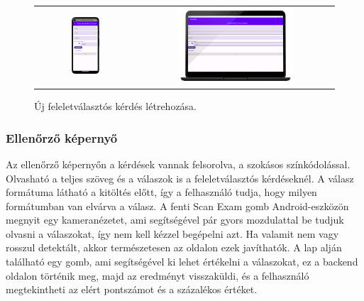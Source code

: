 \begin{figure}[!ht]
    \centering
    \begin{tabular}{cc}
        \includegraphics[width=0.3\textwidth, keepaspectratio]{figures/New_Android.png} & 
        \includegraphics[width=0.6\textwidth, keepaspectratio]{figures/New_Desktop_framed.png}
    \end{tabular}
    \caption{Új feleletválasztós kérdés létrehozása.}
    \label{fig:NewScreen}
\end{figure}


\subsubsection{Ellenőrző képernyő}

Az ellenőrző képernyőn a kérdések vannak felsorolva, a szokásos színkódolással.
Olvasható a teljes szöveg és a válaszok is a feleletválasztós kérdéseknél.
A válasz formátuma látható a kitöltés előtt, így a felhasználó tudja, hogy milyen formátumban van elvárva a válasz.
A fenti Scan Exam gomb Android-eszközön megnyit egy kameranézetet, ami segítségével pár gyors mozdulattal be tudjuk olvasni a válaszokat, így nem kell kézzel begépelni azt.
Ha valamit nem vagy rosszul detektált, akkor természetesen az oldalon ezek javíthatók.
A lap alján található egy gomb, ami segítségével ki lehet értékelni a válaszokat, ez a backend oldalon történik meg, majd az eredményt visszaküldi, és a felhasználó megtekintheti az elért pontszámot és a százalékos értéket.

